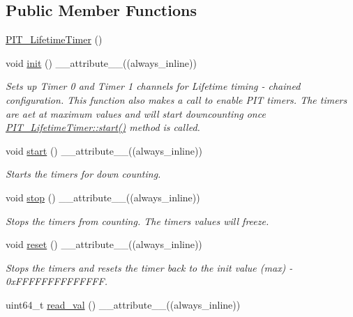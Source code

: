 \subsection*{Public Member Functions}
\begin{DoxyCompactItemize}
\item 
\hyperlink{classPIT__LifetimeTimer_a826797e75688ab4e7cd5c8854fa6a7c0}{P\+I\+T\+\_\+\+Lifetime\+Timer} ()
\item 
void \hyperlink{classPIT__LifetimeTimer_ad1c585d138123be94769afcca87f2dc6}{init} () \+\_\+\+\_\+attribute\+\_\+\+\_\+((always\+\_\+inline))
\begin{DoxyCompactList}\small\item\em Sets up Timer 0 and Timer 1 channels for Lifetime timing -\/ chained configuration. This function also makes a call to enable P\+IT timers. The timers are aet at maximum values and will start downcounting once \hyperlink{classPIT__LifetimeTimer_a6feabeff2529cabaf27ef53d027a4fc9}{P\+I\+T\+\_\+\+Lifetime\+Timer\+::start()} method is called. \end{DoxyCompactList}\item 
void \hyperlink{classPIT__LifetimeTimer_a6feabeff2529cabaf27ef53d027a4fc9}{start} () \+\_\+\+\_\+attribute\+\_\+\+\_\+((always\+\_\+inline))
\begin{DoxyCompactList}\small\item\em Starts the timers for down counting. \end{DoxyCompactList}\item 
void \hyperlink{classPIT__LifetimeTimer_a92543f292044725b1dea4d009e01d9e4}{stop} () \+\_\+\+\_\+attribute\+\_\+\+\_\+((always\+\_\+inline))
\begin{DoxyCompactList}\small\item\em Stops the timers from counting. The timers values will freeze. \end{DoxyCompactList}\item 
void \hyperlink{classPIT__LifetimeTimer_a5c1c38cfa6c7a049a495ee3d89e13276}{reset} () \+\_\+\+\_\+attribute\+\_\+\+\_\+((always\+\_\+inline))
\begin{DoxyCompactList}\small\item\em Stops the timers and resets the timer back to the init value (max) -\/ 0x\+F\+F\+F\+F\+F\+F\+F\+F\+F\+F\+F\+F\+FF. \end{DoxyCompactList}\item 
uint64\+\_\+t \hyperlink{classPIT__LifetimeTimer_a4ee08cce7812322a7a10fcba0463476c}{read\+\_\+val} () \+\_\+\+\_\+attribute\+\_\+\+\_\+((always\+\_\+inline))

\end{DoxyCompactItemize}
